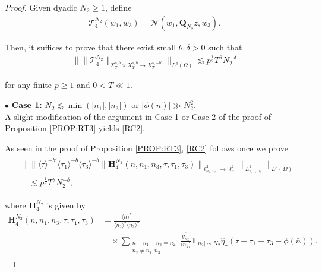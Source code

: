 \documentclass[%
11pt,  reqno]{amsart}
\newcommand{\1}{\hspace{0.2mm}\text{I}\hspace{0.2mm}}
\newcommand{\noi}{\noindent}
\newcommand{\Q}{\mathbf{Q}}
\newcommand{\dl}{\delta}
\newcommand{\ft}{\widehat}
\newcommand{\cj}{\overline}
\newcommand{\ta}{\theta}
\renewcommand{\l}{\ell}
\renewcommand{\O}{\Omega}
\newcommand{\les}{\lesssim}
\newcommand{\jb}[1]
{\langle #1 \rangle}
\newcommand{\ind}{\mathbf 1}
\newcommand{\NN}{\mathcal{N}}
\numberwithin{equation}{section}
\numberwithin{theorem}{section}
\newcommand{\Hb}{\mathbf{H}}
\newcommand{\TT}{\mathcal{T}}
\begin{document}
\begin{proof}


Given dyadic $N_2 \ge 1$, define
\begin{align*}
\TT_4^{N_2} (w_1, w_3) =  \NN(w_1, \Q_{N_2} z, w_3).
\end{align*}



\noi
Then, it suffices to prove that 
there exist 
 small $\ta, \dl > 0$ such that 
\begin{align}
\Big\| \| \TT_4^{N_2} 
\|_{X^{s,b}_T\times X^{s,b}_T  \to X^{s,-b'}_T} 
\Big\|_{L^p (\O)} 
\les p^\frac 12   T^\ta N_2^{-\dl} 
\label{RC2}
\end{align}

\noi
for any finite $p \ge 1$ and $0 < T\ll 1$.





\medskip

\noi 
$\bullet$ {\bf Case 1:}
$N_2  \les \min(|n_1|, |n_3|)$ or 
$|\phi(\bar n)| \gg  N_2^2$.
\\
\indent
A slight modification of the argument in Case 1 
or Case 2 of the proof of Proposition \ref{PROP:RT3}
yields \eqref{RC2}.


\medskip

As seen in the proof of Proposition \ref{PROP:RT3}, 
 \eqref{RC2}
follows once we prove 
\begin{align}
\begin{split}
& \Big\|
\big\|  \jb{\tau}^{-b'} \jb{\tau_1}^{-b} \jb{\tau_3}^{-b}
\| \Hb_4^{N_2}(n,n_1,n_3,\tau,\tau_1,\tau_3) \|_{\l^2_{n_1, n_3} \to \l^2_n}  \big\|_{L^2_{\tau,\tau_1,\tau_3}}
\Big\|_{L^p(\O)}\\
& \quad \les p^\frac 12   T^\ta N_2^{-\dl},  
\end{split}
\label{RC5}
\end{align}


\noi 
where 
$\Hb_4^{N_2}$ is given by 
\begin{align*}
\Hb_4^{N_2} (n,n_1,n_3,\tau,\tau_1,\tau_3)  
& = 
\frac{\jb{n}^s}{\jb{n_1}^s \jb{n_3}^s} \\
& \quad \times  \sum_{\substack{n - n_1 - n_3 = n_2\\
n_2 \ne n_1, n_3}}
\frac{\cj{g_{n_2}}  }{\jb{n_2}}  \ind_{|n_2|\sim N_2}
 \ft \eta_{_T}  (\tau - \tau_1 - \tau_3 - \phi (\bar n)).
\end{align*}


\end{proof}
\end{document}
